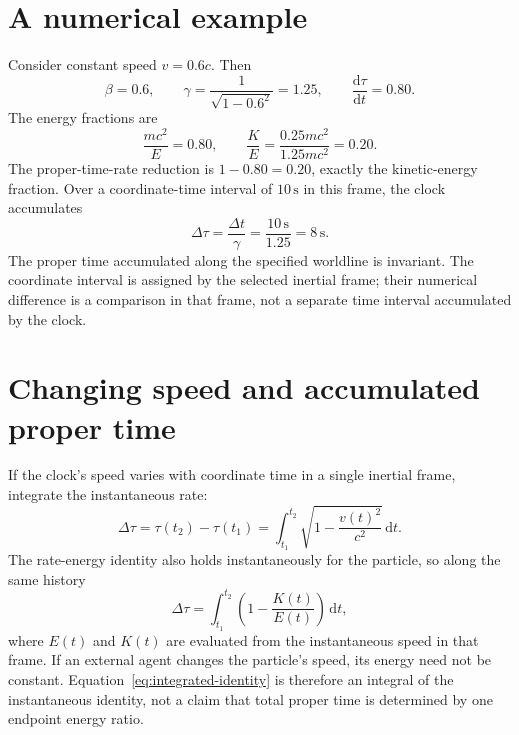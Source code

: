 \documentclass[12pt]{article}
\begin{document}
\section{A numerical example}

Consider constant speed $v=0.6c$. Then
\begin{equation}
  \beta=0.6,
  \qquad
  \gamma=\frac{1}{\sqrt{1-0.6^2}}=1.25,
  \qquad
  \frac{\mathrm{d}\tau}{\mathrm{d}t}=0.80.
  \label{eq:example-values}
\end{equation}
The energy fractions are
\begin{equation}
  \frac{mc^2}{E}=0.80,
  \qquad
  \frac{K}{E}=\frac{0.25mc^2}{1.25mc^2}=0.20.
  \label{eq:example-energy-fractions}
\end{equation}
The proper-time-rate reduction is $1-0.80=0.20$, exactly the kinetic-energy fraction. Over a coordinate-time interval of $10\,\mathrm{s}$ in this frame, the clock accumulates
\begin{equation}
  \Delta\tau=\frac{\Delta t}{\gamma}
  =\frac{10\,\mathrm{s}}{1.25}=8\,\mathrm{s}.
  \label{eq:example-proper-time}
\end{equation}
The proper time accumulated along the specified worldline is invariant. The coordinate interval is assigned by the selected inertial frame; their numerical difference is a comparison in that frame, not a separate time interval accumulated by the clock.

\section{Changing speed and accumulated proper time}

If the clock's speed varies with coordinate time in a single inertial frame, integrate the instantaneous rate:
\begin{equation}
  \Delta\tau
  =\tau(t_2)-\tau(t_1)
  =\int_{t_1}^{t_2}
    \sqrt{1-\frac{v(t)^2}{c^2}}\,\mathrm{d}t.
  \label{eq:proper-time-integral}
\end{equation}
The rate-energy identity also holds instantaneously for the particle, so along the same history
\begin{equation}
  \Delta\tau
  =\int_{t_1}^{t_2}
    \left(1-\frac{K(t)}{E(t)}\right)\,\mathrm{d}t,
  \label{eq:integrated-identity}
\end{equation}
where $E(t)$ and $K(t)$ are evaluated from the instantaneous speed in that frame. If an external agent changes the particle's speed, its energy need not be constant. Equation~\eqref{eq:integrated-identity} is therefore an integral of the instantaneous identity, not a claim that total proper time is determined by one endpoint energy ratio.
\end{document}
